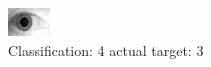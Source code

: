 \begin{figure}[h!]
\begin{center}
\includegraphics[width=0.60\columnwidth]{figures/ID1905_class_4_target_3.png}
\end{center}
\caption{ Classification: 4 actual target: 3}
\label{fig:ID1905_class_4_target_3}
\end{figure}

